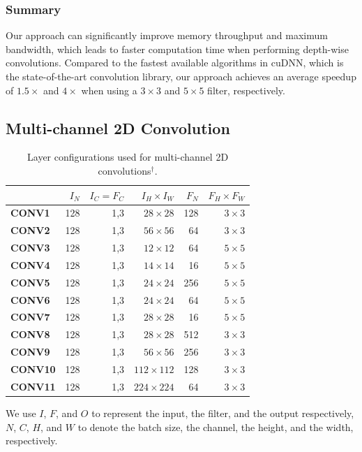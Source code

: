 \subsubsection{Summary}
Our approach can significantly improve memory throughput and maximum bandwidth, which leads to faster computation time when performing
depth-wise convolutions.  Compared to the fastest available algorithms in cuDNN, which is the state-of-the-art convolution library, our
approach achieves an average speedup of $1.5\times$ and $4\times$ when using a $3 \times 3$ and $5 \times 5$ filter, respectively.


\subsection{Multi-channel 2D Convolution}
\label{multicconvexp}

\begin{table}[]
\caption{Layer configurations used for multi-channel 2D convolutions$^{\dag}$.}
\label{tab:3dconvconfigs}
\begin{threeparttable}
\begin{tabular}{lrrrrr}
\toprule
& \textbf{$I_N$} & \textbf{$I_C=F_C$} & \textbf{$I_H \times I_W$} & \textbf{$F_N$} & \textbf{$F_H \times F_W$} \\
\midrule
\textbf{CONV1} & 128  & 1,3       & $28\times 28$     & 128  & $3\times 3$       \\
\textbf{CONV2} & 128  & 1,3       & $56\times 56$     & 64   & $3\times 3$       \\
\textbf{CONV3} & 128  & 1,3       & $12\times 12$     & 64   & $5\times 5$       \\
\textbf{CONV4} & 128  & 1,3       & $14\times 14$     & 16   & $5 \times 5$       \\
\textbf{CONV5} & 128  & 1,3       & $24\times 24$    & 256  & $5 \times 5$       \\
\textbf{CONV6} & 128  & 1,3       & $24\times 24$     & 64   & $5\times 5$       \\
\textbf{CONV7} & 128  & 1,3       & $28\times 28$     & 16   & $5\times 5$       \\
\textbf{CONV8} & 128  & 1,3       & $28\times 28$     & 512   & $3\times 3$       \\
\textbf{CONV9} & 128  & 1,3       & $56\times 56$     & 256  & $3\times 3$       \\
\textbf{CONV10} & 128  & 1,3       & $112\times 112$     & 128   & $3\times 3$       \\
\textbf{CONV11} &128  & 1,3       & $224\times 224$     & 64   & $3\times 3$      \\
\bottomrule
\end{tabular}
\begin{tablenotes}
\item[\dag] We use $I$, $F$, and $O$ to represent the input, the filter, and the output respectively, $N$, $C$, $H$, and $W$
to denote the batch size, the channel, the height, and the width, respectively.
\end{tablenotes}
\end{threeparttable}
\end{table}

